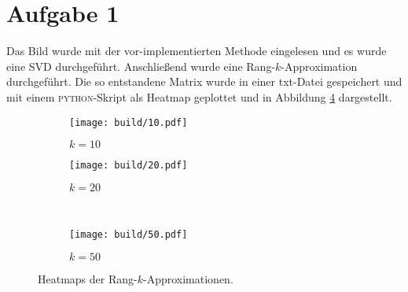 \section*{Aufgabe 1}
Das Bild wurde mit der vor-implementierten Methode eingelesen und es wurde
eine SVD durchgeführt. Anschließend wurde eine Rang-$k$-Approximation durchgeführt.
Die so entstandene Matrix wurde in einer txt-Datei gespeichert und mit einem
\textsc{python}-Skript als Heatmap geplottet und in Abbildung \ref{fig:1}
dargestellt.
\begin{figure}
  \centering
  \begin{subfigure}{0.49\textwidth}
    \texttt{[image: build/10.pdf]}
    \caption{$k = 10$}
    \label{sub:10}
  \end{subfigure}
  \begin{subfigure}{0.49\textwidth}
    \texttt{[image: build/20.pdf]}
    \caption{$k = 20$}
    \label{sub:20}
  \end{subfigure}
  \\
  \centering
  \begin{subfigure}{0.49\textwidth}
    \texttt{[image: build/50.pdf]}
    \caption{$k = 50$}
    \label{sub:50}
  \end{subfigure}
  \caption{Heatmaps der Rang-$k$-Approximationen.}
  \label{fig:1}
\end{figure}
